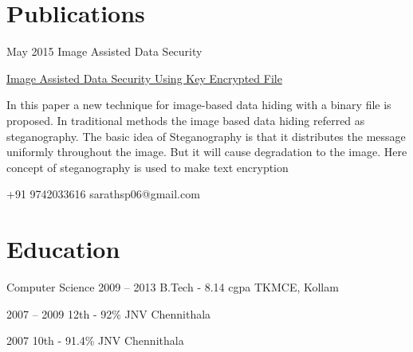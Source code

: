 \documentclass{tccv}
\begin{document}
\section{Publications}

\begin{eventlist}
\item{May 2015}{   }
     {Image Assisted Data Security}
     
\href{http://www.ijert.org/view-pdf/13070/image-assisted-data-security-using-key-encrypted-file}{Image Assisted Data Security Using Key Encrypted File}

In this paper a new technique for image-based data hiding with a binary file is proposed. In traditional methods the image based data hiding referred as steganography. The basic idea of Steganography is that it distributes the message uniformly throughout the image. But it will cause degradation to the image. Here concept of steganography is used to make text encryption

\end{eventlist}




    {+91 9742033616}
    {sarathsp06@gmail.com}

\section{Education}

\begin{yearlist}

\item[Computer Science]{2009 -- 2013}
     {B.Tech - 8.14 cgpa }
     {TKMCE, Kollam }

\item{2007 -- 2009}
     {12th - 92\% }
     {JNV Chennithala}

\item{2007 }
     {10th - 91.4\% }
     {JNV Chennithala}


\end{yearlist}


\end{document}
